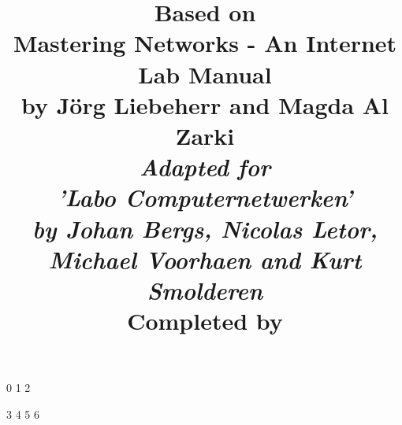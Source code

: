 

\title{
\textbf{Based on \\ Mastering Networks - An Internet Lab Manual\\
by J\"{o}rg Liebeherr and Magda Al Zarki}\\
\vspace{10mm}
\large{\emph{Adapted for \\ 'Labo Computernetwerken' \\
by Johan Bergs, Nicolas Letor, Michael Voorhaen and Kurt Smolderen}} \\
\vspace{10mm}
\large{Completed by}
\vspace{-10mm}
}




\frontmatter
\maketitle

\mainmatter
%
\setcounter {chapter} {0}
%
\setcounter {chapter} {1}
%
\setcounter {chapter} {2}

\setcounter {chapter} {3}
%
\setcounter {chapter} {4}
%
\setcounter {chapter} {5}
%
\setcounter {chapter} {6}
%
\backmatter


 
